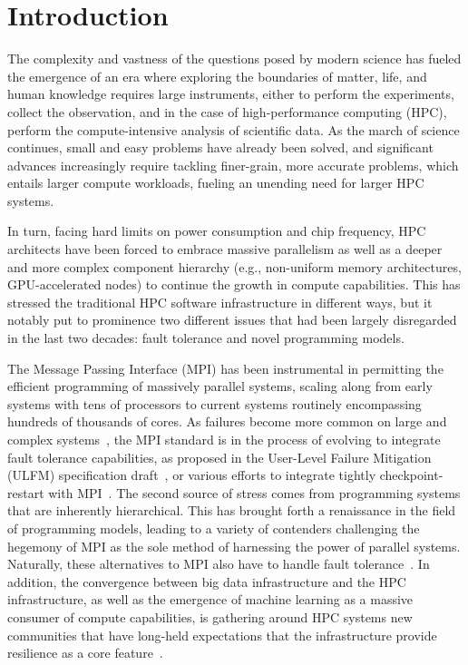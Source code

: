 \documentclass[5p,times,twocolumn]{elsarticle}
\newcommand{\ulfm}[0]{\textsc{ULFM}\xspace}
\newcommand{\mpi}[0]{\textsc{MPI}\xspace}
\begin{document}
%
\maketitle

\section{Introduction}\label{sec:intro}

The complexity and vastness of the questions posed by modern science has
fueled the emergence of an era where exploring the boundaries of matter, life,
and human knowledge requires large instruments, either to perform the
experiments, collect the observation, and in the
case of high-performance computing (HPC), perform the compute-intensive
analysis of scientific data. As the march of science continues, small and
easy problems have already been solved, and significant advances increasingly
require tackling finer-grain, more accurate problems, which entails larger compute workloads, fueling an unending need for larger
HPC systems.

In turn, facing hard limits on power consumption and chip frequency,
HPC architects have been forced to embrace massive parallelism as well as
a deeper and more complex component hierarchy (e.g., non-uniform memory architectures,
GPU-accelerated nodes) to continue the growth in compute capabilities.
This has stressed the traditional HPC software infrastructure in different
ways, but it notably put to prominence two different issues that had been
largely disregarded in the last two decades: fault tolerance and novel programming
models.

The Message Passing Interface (\mpi) has been instrumental in
permitting the efficient programming of massively parallel systems, scaling
along from early systems with tens of processors to current systems routinely
encompassing hundreds of thousands of cores. As failures become more
common on large and complex systems~\cite{di2016measuring}, the \mpi standard is in the process of
evolving to integrate fault tolerance capabilities, as proposed in the
User-Level Failure Mitigation (\ulfm) specification draft~\cite{Bland2013}, or
various efforts to integrate tightly checkpoint-restart with \mpi~\cite{reinit18}.
The second source of stress comes from programming systems that are inherently
hierarchical. This has brought forth a renaissance in the field of
programming models, leading to a variety of contenders challenging the
hegemony of \mpi as the sole method of harnessing the power of parallel systems.
Naturally, these alternatives to \mpi also have to handle fault tolerance~\cite{7161563, Unified-ft, shmem-ft15, Surviving-Errors, X10-ft16}.
In addition, the convergence
between big data infrastructure and the HPC infrastructure, as well as
the emergence of machine learning as a massive consumer of compute
capabilities, is gathering around HPC systems new communities that
have long-held expectations that the infrastructure provide resilience as a core feature~\cite{hadoop-ft}.
\end{document}
